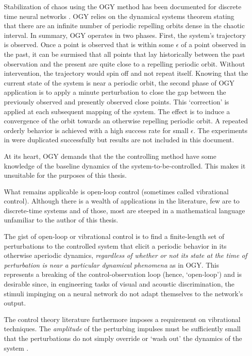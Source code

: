 \documentclass[12pt]{article}
\begin{document}
Stabilization of chaos using the OGY method has been documented
for discrete time neural networks \cite{yu}.  OGY relies on the dynamical
systems theorem stating that there are an infinite number of periodic
repelling orbits dense in the chaotic interval.  In summary, OGY operates in
two phases.  First, the system's trajectory is observed.  Once a point is
observed that is within some $\epsilon$ of a point observed in the past, it
can be surmised that all points that lay historically between the past
observation and the present are quite close to a repelling periodic orbit.
Without intervention, the trajectory would spin off and not repeat itself.
Knowing that the current state of the system is near a periodic orbit, the
second phase of OGY application is to apply a minute perturbation to close
the gap between the previously observed and presently observed close points.
This `correction' is applied at each subsequent mapping of the system.  The
effect is to induce a convergence of the orbit towards an otherwise repelling
periodic orbit.  A repeated orderly behavior is achieved with a high success
rate for small $\epsilon$.  The experiments in \cite{yu} were duplicated
successfully but results are not included in this document.

At its heart, OGY demands that the
the controlling method have some knowledge of the
baseline dynamics of the system-to-be-controlled.  This makes it unsuitable for
the purposes of this thesis.

What remains applicable is open-loop control (sometimes called vibrational
control).  Although there is a wealth of applications in the literature,
few are to discrete-time systems and of those, most are steeped in a
mathematical language unfamiliar to the author of this thesis.

The gist of open-loop or vibrational control is to find a finite-length set of
perturbations to the controlled system that elicit a periodic behavior in
its otherwise aperiodic dynamics, \textit{regardless of whether or not its
state at the time of perturbation is near a particular dynamical phenomena}
as in OGY.  This represents a breaking of the control-observation loop
(hence, `open-loop') and is desirable since, in engineering tasks of
visual and acoustic discrimination, the stimuli impinging on a neural network
do not adapt themselves to the network's output.

The control theory literature furthermore imposes a requirement on
vibrational techniques.  The \textit{amplitude} of the
perturbing impulses must be sufficiently small that the perturbations do
not simply override or `wash out' the dynamics
of the system \cite{control_review}.
\end{document}
